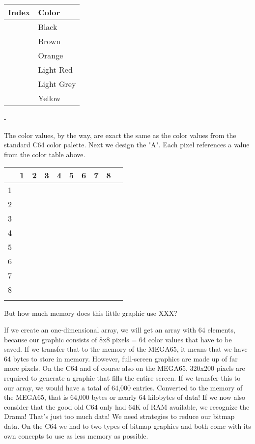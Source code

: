 \setlength\minrowclearance{4pt}
\begin{tabular}{m{22pt}|m{60pt}}
	Index & Color \\\hline
	\blk & Black \\
	\bwn & Brown \\
	\ora & Orange \\
	\red & Light Red \\
	\lgr & Light Grey \\
	\yel & Yellow \\
\end{tabular}-

The color values, by the way, are exact the same as the color values from the standard C64 color palette. Next we design the "A". Each pixel references a value from the color table above.


\setlength\minrowclearance{4pt}
\begin{tabular}{m{4pt}|m{4pt}m{4pt}m{4pt}m{4pt}m{4pt}m{4pt}m{4pt}m{4pt}m{4pt}}
	& 1 & 2 & 3& 4& 5& 6& 7& 8 &\\\hline

	1 & \blk & \blk & \blk & \blk & \blk & \blk & \blk & \blk & \\
	2 & \red & \lgr & \yel & \lgr & \red & \ora & \blk & \blk & \\
	3 & \lgr & \lgr & \blk & \blk & \ora & \red & \blk & \blk & \\
	4 & \yel & \yel & \blk & \blk & \ora & \red & \blk & \blk & \\
	5 & \yel & \lgr & \lgr & \red & \red & \red & \blk & \blk & \\
	6 & \lgr & \red & \blk & \blk & \ora & \red & \blk & \blk & \\
	7 & \red & \red & \blk & \blk & \red & \red & \blk & \blk & \\
	8 & \ora & \bwn & \blk & \blk & \ora & \red & \blk & \blk & \\

	&&&&&&&&&
\end{tabular}

But how much memory does this little graphic use XXX?

If we create an one-dimensional array, we will get an array with 64 elements, because our graphic consists of 8x8 pixels = 64 color values that have to be saved. If we transfer that to the memory of the MEGA65, it means that we have 64 bytes to store in memory. However, full-screen graphics are made up of far more pixels. On the C64 and of course also on the MEGA65, 320x200 pixels are required to generate a graphic that fills the entire screen. If we transfer this to our array, we would have a total of 64,000 entries. Converted to the memory of the MEGA65, that is 64,000 bytes or nearly 64 kilobytes of data! If we now also consider that the good old C64 only had 64K of RAM available, we recognize the Drama! That's just too much data! We need strategies to reduce our bitmap data. On the C64 we had to two types of bitmap graphics and both come with its own concepts to use as less memory as possible.

